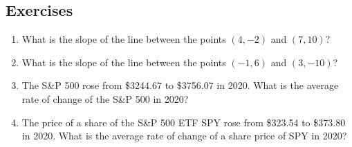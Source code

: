 \subsection{Exercises}

\begin{enumerate}
    \item What is the slope of the line between the points $(4, -2)$ and $(7, 10)$?
    \item What is the slope of the line between the points $(-1, 6)$ and $(3, -10)$?
    \item The S\&P 500 rose from \$3244.67 to \$3756.07 in 2020. What is the average rate of change of the S\&P 500 in 2020?
    \item The price of a share of the S\&P 500 ETF SPY rose from \$323.54 to \$373.80 in 2020. What is the average rate of change of a share price of SPY in 2020?
\end{enumerate}

